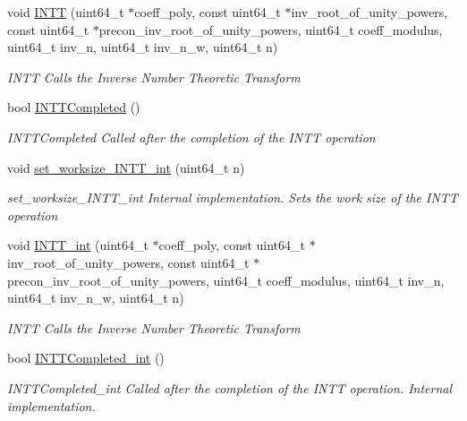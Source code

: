 \begin{DoxyCompactItemize}
void \hyperlink{namespaceintel_1_1hexl_1_1fpga_adb362cf8c73fdf8d22c75cbc7524c843}{I\-N\-T\-T} (uint64\-\_\-t $\ast$coeff\-\_\-poly, const uint64\-\_\-t $\ast$inv\-\_\-root\-\_\-of\-\_\-unity\-\_\-powers, const uint64\-\_\-t $\ast$precon\-\_\-inv\-\_\-root\-\_\-of\-\_\-unity\-\_\-powers, uint64\-\_\-t coeff\-\_\-modulus, uint64\-\_\-t inv\-\_\-n, uint64\-\_\-t inv\-\_\-n\-\_\-w, uint64\-\_\-t n)
\begin{DoxyCompactList}\small\item\em I\-N\-T\-T Calls the Inverse Number Theoretic Transform \end{DoxyCompactList}\item 
bool \hyperlink{namespaceintel_1_1hexl_1_1fpga_a68437eb625e24737902a181cf11f2298}{I\-N\-T\-T\-Completed} ()
\begin{DoxyCompactList}\small\item\em I\-N\-T\-T\-Completed Called after the completion of the I\-N\-T\-T operation \end{DoxyCompactList}\item 
void \hyperlink{namespaceintel_1_1hexl_1_1fpga_aadedc3c7037f9134a01351c822d33cda}{set\-\_\-worksize\-\_\-\-I\-N\-T\-T\-\_\-int} (uint64\-\_\-t n)
\begin{DoxyCompactList}\small\item\em set\-\_\-worksize\-\_\-\-I\-N\-T\-T\-\_\-int Internal implementation. Sets the work size of the I\-N\-T\-T operation \end{DoxyCompactList}\item 
void \hyperlink{namespaceintel_1_1hexl_1_1fpga_ac90669a31121655f1d88a55ef795937b}{I\-N\-T\-T\-\_\-int} (uint64\-\_\-t $\ast$coeff\-\_\-poly, const uint64\-\_\-t $\ast$inv\-\_\-root\-\_\-of\-\_\-unity\-\_\-powers, const uint64\-\_\-t $\ast$precon\-\_\-inv\-\_\-root\-\_\-of\-\_\-unity\-\_\-powers, uint64\-\_\-t coeff\-\_\-modulus, uint64\-\_\-t inv\-\_\-n, uint64\-\_\-t inv\-\_\-n\-\_\-w, uint64\-\_\-t n)
\begin{DoxyCompactList}\small\item\em I\-N\-T\-T Calls the Inverse Number Theoretic Transform \end{DoxyCompactList}\item 
bool \hyperlink{namespaceintel_1_1hexl_1_1fpga_a69aca407f3b48e7e88059b4f15619851}{I\-N\-T\-T\-Completed\-\_\-int} ()
\begin{DoxyCompactList}\small\item\em I\-N\-T\-T\-Completed\-\_\-int Called after the completion of the I\-N\-T\-T operation. Internal implementation. \end{DoxyCompactList}\item 

\end{DoxyCompactItemize}
